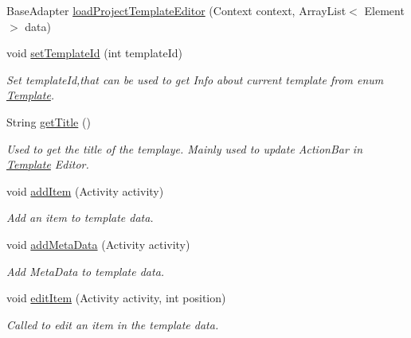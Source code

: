 \begin{DoxyCompactItemize}
\item 
Base\+Adapter \hyperlink{interfaceorg_1_1buildmlearn_1_1toolkit_1_1model_1_1TemplateInterface_ac0637282a7f7b58a4e9b8e86a734bf93}{load\+Project\+Template\+Editor} (Context context, Array\+List$<$ Element $>$ data)
\item 
void \hyperlink{interfaceorg_1_1buildmlearn_1_1toolkit_1_1model_1_1TemplateInterface_ae84eac484da25355ba7ace669d7b0c90}{set\+Template\+Id} (int template\+Id)
\begin{DoxyCompactList}\small\item\em Set template\+Id,that can be used to get Info about current template from enum \hyperlink{enumorg_1_1buildmlearn_1_1toolkit_1_1model_1_1Template}{Template}. \end{DoxyCompactList}\item 
String \hyperlink{interfaceorg_1_1buildmlearn_1_1toolkit_1_1model_1_1TemplateInterface_a98a8592a7e4928ce76d0c61df17cf5c8}{get\+Title} ()
\begin{DoxyCompactList}\small\item\em Used to get the title of the templaye. Mainly used to update Action\+Bar in \hyperlink{enumorg_1_1buildmlearn_1_1toolkit_1_1model_1_1Template}{Template} Editor. \end{DoxyCompactList}\item 
void \hyperlink{interfaceorg_1_1buildmlearn_1_1toolkit_1_1model_1_1TemplateInterface_a4b0102080f73bee8b91530e03e995311}{add\+Item} (Activity activity)
\begin{DoxyCompactList}\small\item\em Add an item to template data. \end{DoxyCompactList}\item 
void \hyperlink{interfaceorg_1_1buildmlearn_1_1toolkit_1_1model_1_1TemplateInterface_a4dcf463c18db372074327d828e56cf2d}{add\+Meta\+Data} (Activity activity)
\begin{DoxyCompactList}\small\item\em Add Meta\+Data to template data. \end{DoxyCompactList}\item 
void \hyperlink{interfaceorg_1_1buildmlearn_1_1toolkit_1_1model_1_1TemplateInterface_a5a28364a7250ae0a6f18f8173c9df871}{edit\+Item} (Activity activity, int position)
\begin{DoxyCompactList}\small\item\em Called to edit an item in the template data. \end{DoxyCompactList}\item 

\end{DoxyCompactItemize}
